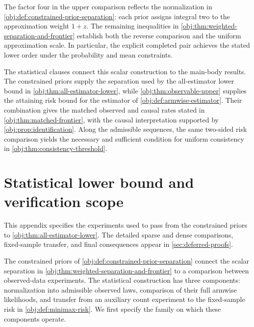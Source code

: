 \documentclass[11pt]{article}
\begin{document}
The factor four in the upper comparison reflects the normalization in \cref{obj:def:constrained-prior-separation}: each prior assigns integral two to the approximation weight \(1+z\). The remaining inequalities in \cref{obj:thm:weighted-separation-and-frontier} establish both the reverse comparison and the uniform approximation scale. In particular, the explicit completed pair achieves the stated lower order under the probability and mean constraints.

The statistical clauses connect this scalar construction to the main-body results. The constrained priors supply the separation used by the all-estimator lower bound in \cref{obj:thm:all-estimator-lower}, while \cref{obj:thm:observable-upper} supplies the attaining risk bound for the estimator of \cref{obj:def:armwise-estimator}. Their combination gives the matched observed and causal rates stated in \cref{obj:thm:matched-frontier}, with the causal interpretation supported by \cref{obj:prop:identification}. Along the admissible sequences, the same two-sided risk comparison yields the necessary and sufficient condition for uniform consistency in \cref{obj:thm:consistency-threshold}.


\section{Statistical lower bound and verification scope}\label{sec:appendix-lower-bound}

This appendix specifies the experiments used to pass from the constrained priors to \cref{obj:thm:all-estimator-lower}. The detailed sparse and dense comparisons, fixed-sample transfer, and final consequences appear in \cref{sec:deferred-proofs}.

The constrained priors of \cref{obj:def:constrained-prior-separation} connect the scalar separation in \cref{obj:thm:weighted-separation-and-frontier} to a comparison between observed-data experiments. The statistical construction has three components: normalization into admissible observed laws, comparison of their full armwise likelihoods, and transfer from an auxiliary count experiment to the fixed-sample risk in \cref{obj:def:minimax-risk}. We first specify the family on which these components operate.
\end{document}
